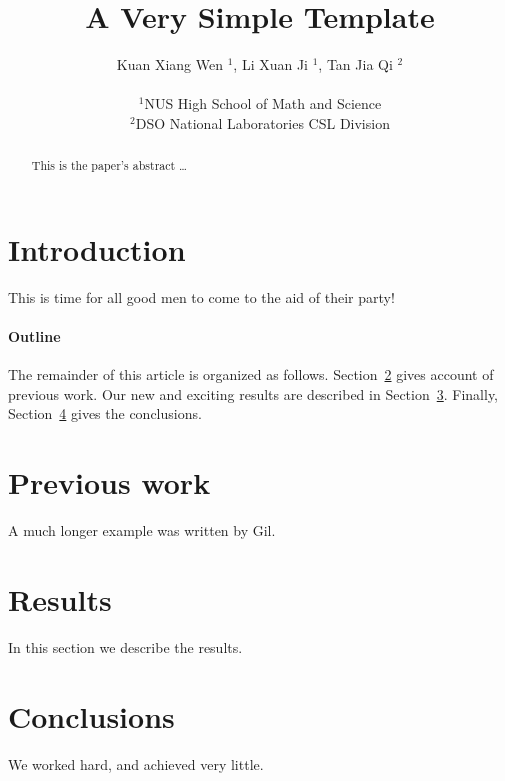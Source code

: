 \documentclass[]{article}
\title{A Very Simple Template}
\date{}
\author{
Kuan Xiang Wen $^{1}$, Li Xuan Ji $^{1}$, Tan Jia Qi $^{2}$\\
\vspace{1 mm} \\
\small{$^{1}$NUS High School of Math and Science}\\
\small{$^{2}$DSO National Laboratories CSL Division}
}
\begin{document}
\maketitle
\begin{abstract}
This is the paper's abstract \ldots
\end{abstract}

\section{Introduction}
This is time for all good men to come to the aid of their party!

\paragraph{Outline}
The remainder of this article is organized as follows.
Section~\ref{previous work} gives account of previous work.
Our new and exciting results are described in Section~\ref{results}.
Finally, Section~\ref{conclusions} gives the conclusions.

\section{Previous work}\label{previous work}
A much longer example was written by Gil.

\section{Results}\label{results}
In this section we describe the results.

\section{Conclusions}\label{conclusions}
We worked hard, and achieved very little.

%
%
\end{document}
